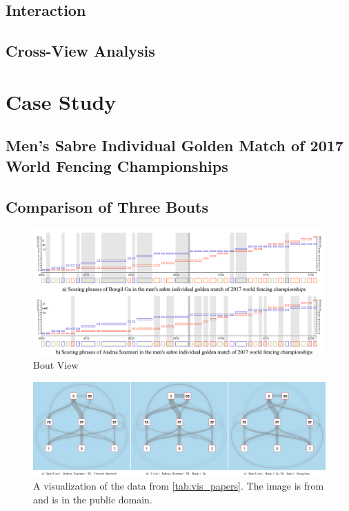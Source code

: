 \documentclass[journal]{vgtc}                %
\begin{document}
\subsection{Interaction}
\subsection{Cross-View Analysis}

\section{Case Study}
\subsection{Men's Sabre Individual Golden Match of 2017 World Fencing Championships}

\subsection{Comparison of Three Bouts}

\begin{figure}[tb]
	\centering
	\includegraphics[width=\linewidth]{ScorePhrases}
	\caption{Bout View}
	\label{fig:boutview}
\end{figure}
\begin{figure}[tb]
	\centering
	\includegraphics[width=\linewidth]{threeBout}
	\caption{A visualization of the data from \autoref{tab:vis_papers}. The image is from \cite{Isenberg:2017:VMC} and is in the public domain.}
	\label{fig:sample}
\end{figure}
\end{document}
